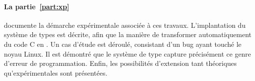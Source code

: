 \paragraph{La partie~\ref{part:xp}} documente la démarche expérimentale associée
à ces travaux. L'implantation du système de types est décrite, afin que la
manière de transformer automatiquement du code C en \langname. Un cas d'étude
est déroulé, consistant d'un bug ayant touché le noyau Linux. Il est démontré
que le système de type capture précisément ce genre d'erreur de programmation.
Enfin, les possibilités d'extension tant théoriques qu'expérimentales sont
présentées.



